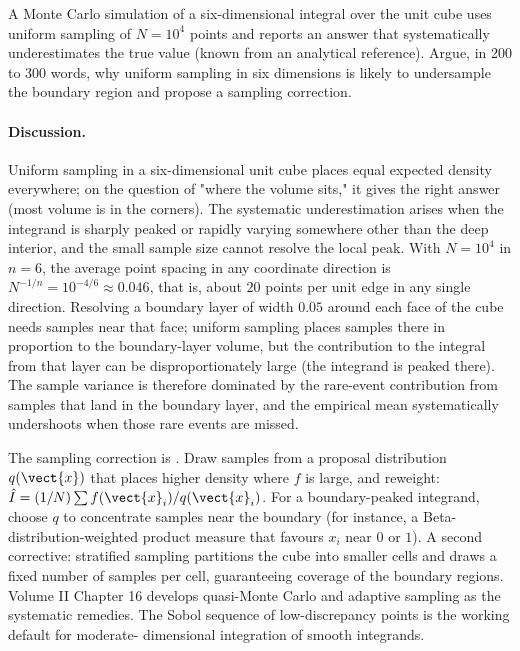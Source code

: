\begin{exercise}
A Monte Carlo simulation of a six-dimensional integral over the
unit cube uses uniform sampling of $N = 10^{4}$ points and reports
an answer that systematically underestimates the true value
(known from an analytical reference). Argue, in 200 to 300 words,
why uniform sampling in six dimensions is likely to undersample the
boundary region and propose a sampling correction.

\paragraph{Discussion.} Uniform sampling in a six-dimensional unit
cube places equal expected density everywhere; on the question of
"where the volume sits," it gives the right answer (most volume is
in the corners). The systematic underestimation arises when the
integrand is sharply peaked or rapidly varying somewhere other than
the deep interior, and the small sample size cannot resolve the
local peak. With $N = 10^{4}$ in $n = 6$, the average point
spacing in any coordinate direction is $N^{-1/n} = 10^{-4/6}
\approx 0.046$, that is, about $20$ points per unit edge in any
single direction. Resolving a boundary layer of width $0.05$ around
each face of the cube needs samples near that face; uniform
sampling places samples there in proportion to the boundary-layer
volume, but the contribution to the integral from that layer can
be disproportionately large (the integrand is peaked there). The
sample variance is therefore dominated by the rare-event
contribution from samples that land in the boundary layer, and
the empirical mean systematically undershoots when those rare
events are missed.

The sampling correction is . Draw
samples from a proposal distribution $q(\vect{x})$ that places
higher density where $f$ is large, and reweight: $\hat{I} =
(1/N)\sum f(\vect{x}_{i})/q(\vect{x}_{i})$. For a boundary-peaked
integrand, choose $q$ to concentrate samples near the boundary
(for instance, a Beta-distribution-weighted product measure that
favours $x_{i}$ near $0$ or $1$). A second corrective: stratified
sampling partitions the cube into smaller cells and draws a fixed
number of samples per cell, guaranteeing coverage of the boundary
regions. Volume II Chapter 16 develops quasi-Monte Carlo and
adaptive sampling as the systematic remedies. The Sobol sequence
of low-discrepancy points is the working default for moderate-
dimensional integration of smooth integrands.
\end{exercise}

